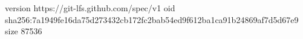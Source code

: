 version https://git-lfs.github.com/spec/v1
oid sha256:7a1949fe16da75d273432cb172fc2bab54ed9f612ba1ca91b24869af7d5d67e9
size 87536
